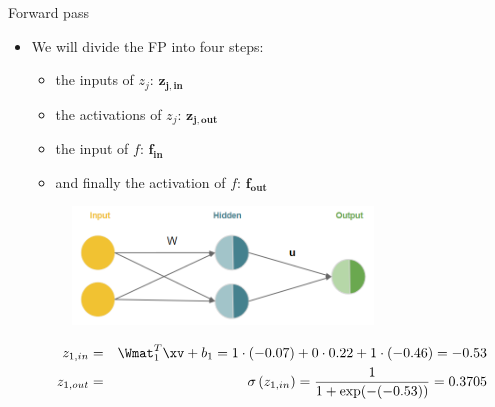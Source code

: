 \begin{vbframe}{ Forward pass}

\begin{itemize}
\item We will divide the FP into four steps:
\begin{itemize}
\item the inputs of $z_j$: $\bm{{z_{j,in}}}$
\item the activations of $z_j$: $\bm{{z_{j,out}}}$
\item the input of $f$: $\bm{{f_{in}}}$
\item and finally the activation of $f$: $\bm{{f_{out}}}$
\end{itemize}
\begin{figure}
\centering
\includegraphics[width=8cm]{figure/xor_rep.png}
\end{figure}
\begin{figure}
\centering
{}
\end{figure}
\begin{footnotesize}
\begin{eqnarray*}
z_{1,in} &=& \Wmat_1^T \xv + b_1 =  1 \cdot (-0.07) + 0 \cdot 0.22 + 1 \cdot (-0.46) = -0.53 \\
z_{1,out} &=& \sigma\left(z_{1,in}\right) = \frac{1}{1+\exp(-(-0.53))} = \num[round-mode=places,round-precision=4]{0.3705169}
\end{eqnarray*}
\end{footnotesize}
\end{itemize}
\framebreak


\end{vbframe}
